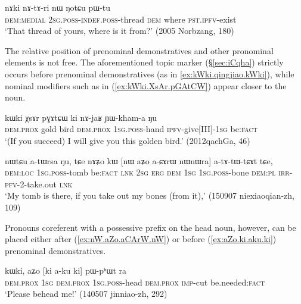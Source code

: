 \begin{exe}
\ex \label{ex:nAki.nAtAri}
 \gll nɤki nɤ-tɤ-ri nɯ ŋotɕu pɯ-tu \\
 \textsc{dem}:\textsc{medial} \textsc{2sg}.\textsc{poss}-\textsc{indef}.\textsc{poss}-thread \textsc{dem} where \textsc{pst}.\textsc{ipfv}-exist \\
\glt `That thread of yours, where is it from?' (2005 Norbzang, 180)
\end{exe}

The relative position of prenominal demonstratives and other pronominal elements is not free. The aforementioned topic marker  (§\ref{sec:iCqha}) strictly occurs before prenominal demonstratives (as in \ref{ex:kWki.qingjiao.kWki}), while nominal modifiers such as  in (\ref{ex:kWki.XsAr.pGAtCW}) appear closer to the noun. 

\begin{exe}
\ex \label{ex:kWki.XsAr.pGAtCW}
 \gll kɯki χsɤr pɣɤtɕɯ ki nɤ-jaʁ ɲɯ-kham-a ŋu \\
\textsc{dem}.\textsc{prox} gold bird \textsc{dem}.\textsc{prox} \textsc{1sg}.\textsc{poss}-hand \textsc{ipfv}-give[III]-\textsc{1sg} be:\textsc{fact} \\
\glt `(If you succeed) I will give you this golden bird.' (2012qachGa, 46)
\end{exe}

\begin{exe}
\ex \label{ex:nW.aZo.aCArW.nW}
 \gll nɯtɕu a-tɯrsa ŋu, tɕe nɤʑo kɯ [nɯ aʑo a-ɕɤrɯ nɯnɯra] a-tɤ-tɯ-tɕɤt tɕe, \\
 \textsc{dem}:\textsc{loc} \textsc{1sg}.\textsc{poss}-tomb be:\textsc{fact} \textsc{lnk} \textsc{2sg} \textsc{erg} \textsc{dem} \textsc{1sg} \textsc{1sg}.\textsc{poss}-bone \textsc{dem}:\textsc{pl} \textsc{irr}-\textsc{pfv}-2-take.out \textsc{lnk} \\
\glt `My tomb is there, if you take out my bones (from it),' (150907 niexiaoqian-zh, 109)
\end{exe}

Pronouns coreferent with a possessive prefix on the head noun, however, can be placed either after (\ref{ex:nW.aZo.aCArW.nW}) or before (\ref{ex:aZo.ki.aku.ki}) prenominal demonstratives.

\begin{exe}
\ex \label{ex:aZo.ki.aku.ki}
 \gll  kɯki, aʑo [ki a-ku ki] pɯ-pʰɯt ra \\
 \textsc{dem}.\textsc{prox} \textsc{1sg}  \textsc{dem}.\textsc{prox} \textsc{1sg}.\textsc{poss}-head  \textsc{dem}.\textsc{prox} \textsc{imp}-cut be.needed:\textsc{fact} \\
 \glt `Please behead me!' (140507 jinniao-zh, 292)
\end{exe}


